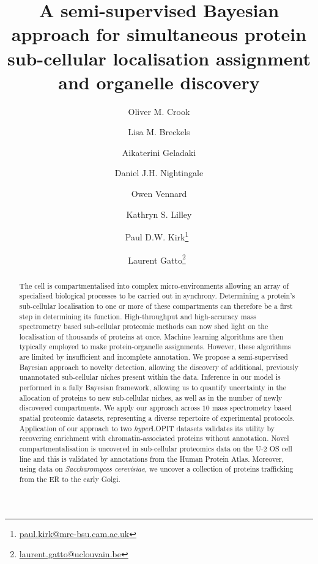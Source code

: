 \documentclass[12pt,english]{article}
\title{A semi-supervised Bayesian approach for simultaneous protein sub-cellular localisation assignment and organelle discovery }
\author[1,2]{Oliver M. Crook}
\author[1]{Lisa M. Breckels}
\author[1]{Aikaterini Geladaki}
\author[1]{Daniel J.H. Nightingale}
\author[1]{Owen Vennard}
\author[1]{Kathryn S. Lilley}
\author[2]{Paul D.W. Kirk\thanks{\url{paul.kirk@mrc-bsu.cam.ac.uk}}~}
\author[3]{Laurent Gatto\thanks{\url{laurent.gatto@uclouvain.be}}~}
\affil[1]{Cambridge Centre for Proteomics, Department of Biochemistry,
	University of Cambridge, Cambridge, UK}
\affil[2]{MRC Biostatistics Unit, Cambridge Institute for Public
	Health, Cambridge, UK}
\affil[3]{de Duve Institute, UCLouvain, Avenue
	Hippocrate 75, 1200 Brussels, Belgium}
\begin{document}
\maketitle

\begin{abstract}
The cell is compartmentalised into complex micro-environments allowing an array of
specialised biological processes to be carried out in synchrony. Determining a protein's sub-cellular localisation to one or more of these compartments can therefore be a first step in determining its function. High-throughput and high-accuracy mass spectrometry based sub-cellular proteomic methods can now shed light on the localisation of thousands of proteins at once. Machine learning algorithms are then typically employed to make protein-organelle assignments. However, these algorithms are limited by insufficient and incomplete annotation. We propose a semi-supervised Bayesian approach to novelty detection, allowing the discovery of additional, previously unannotated sub-cellular niches present within the data. Inference in our model is performed in a fully Bayesian framework, allowing us to quantify uncertainty in the allocation of proteins to new sub-cellular niches, as well as in the number of newly discovered compartments. We apply our approach across $10$ mass spectrometry based spatial proteomic datasets, representing a diverse repertoire of experimental protocols. Application of our approach to two \textit{hyper}LOPIT datasets validates its utility by recovering enrichment with chromatin-associated proteins without annotation. Novel compartmentalisation is uncovered in sub-cellular proteomics data on the U-2 OS cell line and this is validated by annotations from the Human Protein Atlas. Moreover, using data on \textit{Saccharomyces cerevisiae}, we uncover a collection of proteins trafficking from the ER to the early Golgi.
\end{abstract}
\clearpage
\end{document}
